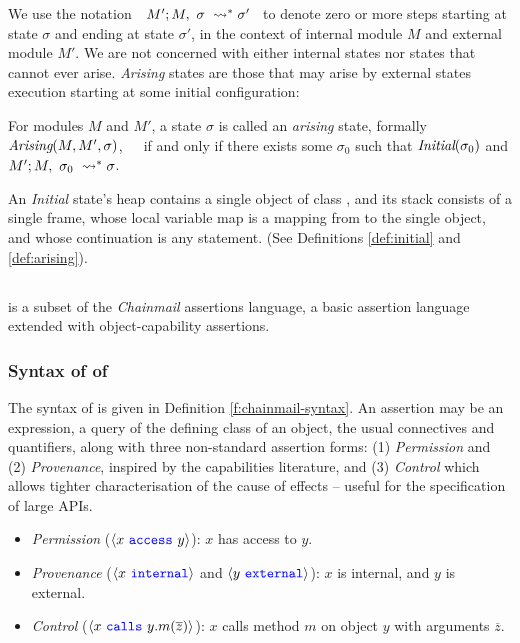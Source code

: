 We  use the notation\ \  $M' ; M,\ \sigma\ \leadsto^* \sigma'$ \ 
to denote
zero or more %
steps starting at state $\sigma$ and ending at state $\sigma'$, in the context of internal module 
$M$ and external module $M'$.
We are not concerned with either internal states nor states that cannot ever arise.
\emph{Arising} states are those that  may arise by external states execution
starting at some initial configuration:



\begin{definition}
\label{def:arising}
For   modules $M$ and  $M'$, a %
 state $\sigma$ is 
called an \emph{arising} state, formally \ \ \ $\textit{Arising}(M, M', \sigma)$,\ \ \ 
if and only if there exists some $\sigma_0$ such that $\textit{Initial}(\sigma_0)$ and
$M' ; M,\ \sigma_0\ \leadsto^* \sigma$.
\end{definition}

An \emph{Initial} state's heap
contains a single object of class , and
its  stack   consists of a single frame, whose local variable map is a
mapping from \prg{this} to the single object, and whose continuation is  any statement.
(See Definitions \ref{def:initial} and \ref{def:arising}).

\subsection{\SpecO}
\label{sub:SpecO}

\SpecO is a subset of the \emph{Chainmail} assertions language, \ie
a basic assertion language extended with
object-capability assertions. 


\subsubsection{Syntax of of \SpecO}
The syntax of \SpecO   is given in
Definition \ref{f:chainmail-syntax}.
An assertion may be an expression,   a query of the defining class of
  an object, the usual connectives and quantifiers, along 
with three non-standard assertion forms:
(1) \emph{Permission} and (2) \emph{Provenance}, inspired by the capabilities literature, and
(3) \emph{Control} which allows tighter  characterisation of the cause of effects --  
useful for the specification of large APIs.
\begin{itemize}
\item
\emph{Permission} ($\langle x\ {\color{blue}\texttt{access}}\ y \rangle$):  
  $x$ has access to $y$.
\item
{\emph{Provenance}} ($\langle x\ {\color{blue}\texttt{internal}}\rangle$ and $\langle y\ {\color{blue}\texttt{external}}\rangle$):   $x$ is internal, and $y$ is external.
\item
\emph{Control} ($\langle x\ {\color{blue}\texttt{calls}}\ y.m(\overline{z}) \rangle$): 
$x$ calls method $m$ on object $y$ with arguments $\overline{z}$.
\end{itemize}


